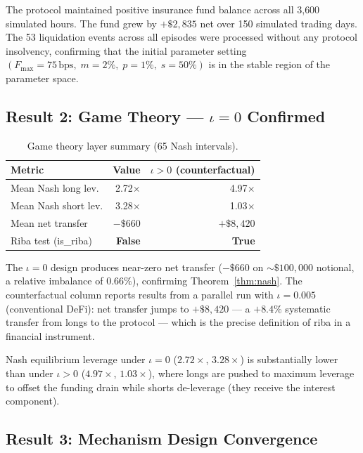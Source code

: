 \documentclass[10pt,twocolumn]{article}
\theoremstyle{plain}
\theoremstyle{definition}
\begin{document}
The protocol maintained positive insurance fund balance
across all 3{,}600 simulated hours.  The fund grew by
$+\$2{,}835$ net over 150 simulated trading days.
The 53 liquidation events across all episodes were
processed without any protocol insolvency,
confirming that the initial parameter setting
$(F_{\max}=75\,\mathrm{bps},\; m=2\%,\; p=1\%,\; s=50\%)$
is in the stable region of the parameter space.

\subsection{Result 2: Game Theory — $\iota=0$ Confirmed}

\begin{table}[h!]
\centering
\caption{Game theory layer summary (65 Nash intervals).}
\label{tab:results_gt}
\small
\begin{tabular}{lrr}
\toprule
Metric & Value & $\iota > 0$ (counterfactual) \\
\midrule
Mean Nash long lev. & 2.72$\times$ & 4.97$\times$ \\
Mean Nash short lev. & 3.28$\times$ & 1.03$\times$ \\
Mean net transfer & $-\$660$ & $+\$8{,}420$ \\
Riba test (is\_riba) & \textcolor{halalgreen}{\textbf{False}} &
  \textcolor{ribared}{\textbf{True}} \\
\bottomrule
\end{tabular}
\end{table}

The $\iota=0$ design produces near-zero net transfer
($-\$660$ on $\sim\$100{,}000$ notional, a relative
imbalance of $0.66\%$), confirming
Theorem~\ref{thm:nash}.  The counterfactual column
reports results from a parallel run with $\iota=0.005$
(conventional DeFi): net transfer jumps to $+\$8{,}420$
--- a $+8.4\%$ systematic transfer from longs to the
protocol --- which is the precise definition of riba
in a financial instrument.

Nash equilibrium leverage under $\iota=0$ ($2.72\times$,
$3.28\times$) is substantially lower than under $\iota>0$
($4.97\times$, $1.03\times$), where longs are pushed
to maximum leverage to offset the funding drain while
shorts de-leverage (they receive the interest component).

\subsection{Result 3: Mechanism Design Convergence}
\end{document}
